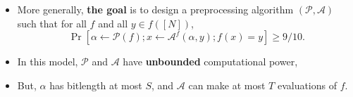 \documentclass[usenames, dvipsnames, t, table]{beamer}
\newcommand{\A}{\mathcal{A}}
\renewcommand{\P}{\mathcal{P}}
\begin{document}
\begin{frame}[fragile]
\begin{itemize}
  \pause
\item More generally, \textbf{the goal} is to design a preprocessing algorithm $(\P, \A)$ such that for all $f$ and all $y \in f([N])$,
     \[\Pr[\alpha \gets \P(f); x \gets \A^f(\alpha, y); f(x) = y] \geq 9/10.\]
     \mypause
   \item In this model, $\P$ and $\A$ have \textbf{unbounded} computational power,
     \pause
   \item But, $\alpha$ has bitlength at most $S$, and $\A$ can make at most $T$ evaluations of $f$.
   \end{itemize}
 \end{frame}

\end{document}
